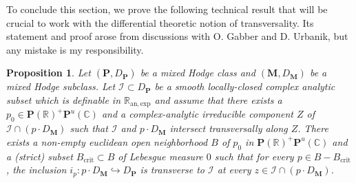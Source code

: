 \documentclass[10pt]{article}
\numberwithin{equation}{subsection}
\theoremstyle{plain}
\newtheorem{proposition}[theorem]{Proposition}
\theoremstyle{definition}
\theoremstyle{remark}
\newcommand{\I}{\mathscr{I}}
\newcommand{\anexp}{\mathbb{R}_\mathrm{an,exp}}
\newcommand{\C}{\mathbb C}
\newcommand{\R}{\mathbb R}
\newcommand{\pp}{\mathbf P}
\newcommand{\M}{\mathbf M}
\begin{document}
To conclude this section, we prove the following technical result that will be crucial to work with the differential theoretic notion of transversality. Its statement and proof arose from discussions with O. Gabber and D. Urbanik, but any mistake is my responsibility.
\begin{proposition}\label{typtotrans}
Let $(\pp, D_\pp)$ be a mixed Hodge class and $(\M, D_\M)$ be a mixed Hodge subclass. Let $\I \subset D_\pp$ be a smooth locally-closed complex analytic subset which is definable in $\anexp$ and assume that there exists a $p_0 \in \pp(\R)^+\pp^u(\C)$ and a complex-analytic irreducible component $Z$ of $\I \cap (p \cdot D_\M)$ such that $\I$ and $p \cdot D_\M$ intersect transversally along $Z$. There exists a non-empty euclidean open neighborhood $B$ of $p_0$ in $\pp(\R)^+ \pp^u(\C)$ and a (strict) subset $B_{\mathrm{crit}} \subset B$ of Lebesgue measure $0$ such that for every $p \in B - B_{\mathrm{crit}}$, the inclusion $i_p : p \cdot D_\M \hookrightarrow D_\pp$ is transverse to $\I$ at every $z \in \I \cap (p \cdot D_\M)$.
\end{proposition}
\end{document}
